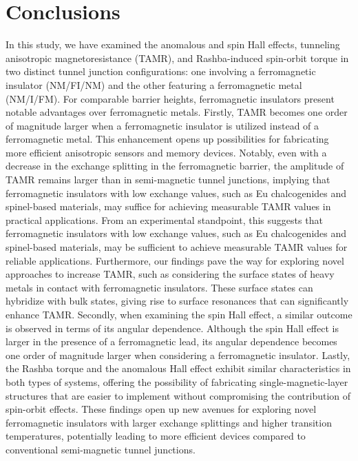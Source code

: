 \documentclass[10pt,pr,twocolumn,showpacs,amssymb,floatfix,superscriptaddress]{revtex4-1}
\begin{document}
\section{Conclusions}\label{sec:sec3}
In this study, we have examined the anomalous and spin Hall effects, tunneling anisotropic magnetoresistance (TAMR), and Rashba-induced spin-orbit torque in two distinct tunnel junction configurations: one involving a ferromagnetic insulator (NM/FI/NM) and the other featuring a ferromagnetic metal (NM/I/FM). For comparable barrier heights, ferromagnetic insulators present notable advantages over ferromagnetic metals. 
Firstly, TAMR becomes one order of magnitude larger when a ferromagnetic insulator is utilized instead of a ferromagnetic metal. This enhancement opens up possibilities for fabricating more efficient anisotropic sensors and memory devices. Notably, even with a decrease in the exchange splitting in the ferromagnetic barrier, the amplitude of TAMR remains larger than in semi-magnetic tunnel junctions, implying that ferromagnetic insulators with low exchange values, such as Eu chalcogenides and spinel-based materials, may suffice for achieving measurable TAMR values in practical applications.
From an experimental standpoint, this suggests that ferromagnetic insulators with low exchange values, such as Eu chalcogenides and spinel-based materials, may be sufficient to achieve measurable TAMR values for reliable applications. Furthermore, our findings pave the way for exploring novel approaches to increase TAMR, such as considering the surface states of heavy metals in contact with ferromagnetic insulators. These surface states can hybridize with bulk states, giving rise to surface resonances that can significantly enhance TAMR. 
Secondly, when examining the spin Hall effect, a similar outcome is observed in terms of its angular dependence. Although the spin Hall effect is larger in the presence of a ferromagnetic lead, its angular dependence becomes one order of magnitude larger when considering a ferromagnetic insulator. 
Lastly, the Rashba torque and the anomalous Hall effect exhibit similar characteristics in both types of systems, offering the possibility of fabricating single-magnetic-layer structures that are easier to implement without compromising the contribution of spin-orbit effects. These findings open up new avenues for exploring novel ferromagnetic insulators with larger exchange splittings and higher transition temperatures, potentially leading to more efficient devices compared to conventional semi-magnetic tunnel junctions.
\end{document}
